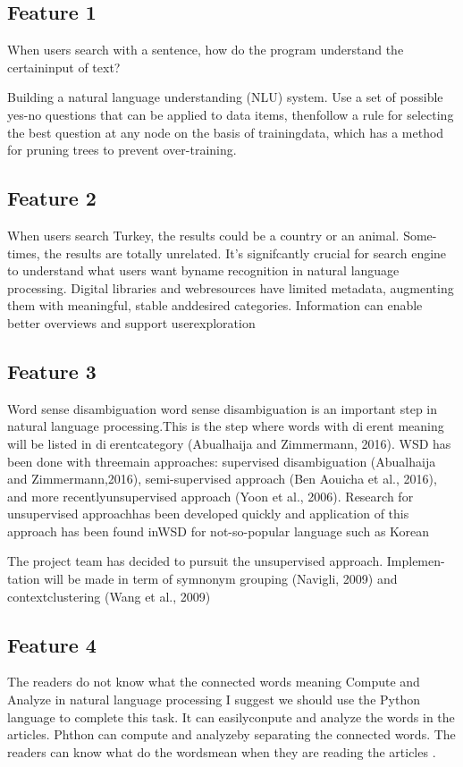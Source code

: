 \documentclass[a4paper]{article} %
\begin{document}
\subsection*{Feature 1 }
\label{task1:feature1}
When users search with a sentence, how do the program understand the certaininput of text?

Building a natural language understanding (NLU) system.
Use a set of possible yes-no questions that can be applied to data items, thenfollow a rule for selecting the best question at any node on the basis of trainingdata, which has a method for pruning trees to prevent over-training.

\subsection*{Feature 2 }
\label{task1:feature2}

When users search Turkey, the results could be a country or an animal.  Some-times, the results are totally unrelated.
It's  signifcantly  crucial  for  search  engine  to  understand  what  users  want  byname  recognition  in  natural  language  processing.   Digital  libraries  and  webresources have limited metadata, augmenting them with meaningful, stable anddesired categories.  Information can enable better overviews and support userexploration
\subsection*{Feature 3 }
\label{task1:feature3}
Word sense disambiguation
word sense disambiguation is an important step in natural language processing.This is the step where words with dierent meaning will be listed in dierentcategory (Abualhaija and Zimmermann, 2016).  WSD has been done with threemain  approaches:   supervised  disambiguation  (Abualhaija  and  Zimmermann,2016), semi-supervised approach (Ben Aouicha et al., 2016), and more recentlyunsupervised approach (Yoon et al., 2006).  Research for unsupervised approachhas been developed quickly and application of this approach has been found inWSD for not-so-popular language such as Korean

The project team has decided to pursuit the unsupervised approach.  Implemen-tation will be made in term of symnonym grouping (Navigli, 2009) and contextclustering (Wang et al., 2009)


\subsection*{Feature 4 }
\label{task1:feature4}
The readers do not know what the connected words meaning
Compute and Analyze in natural language processing
I suggest we should use the Python language to complete this task.  It can easilyconpute and analyze the words in the articles.  Phthon can compute and analyzeby separating the connected words.  The readers can know what do the wordsmean when they are reading the articles .
\end{document}
